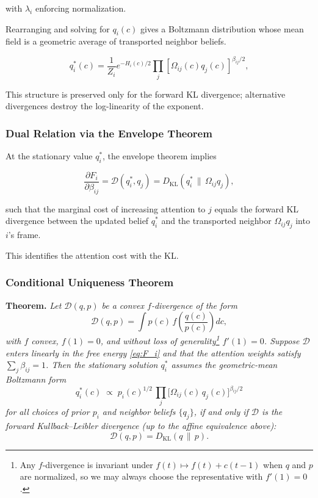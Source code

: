 \documentclass[twoside,11pt]{article}
\begin{document}
with $\lambda_i$ enforcing normalization.

Rearranging and solving for $q_i(c)$ gives a Boltzmann distribution whose mean field is a geometric average of transported neighbor beliefs.

\begin{equation}
q_i^*(c)
= \frac{1}{Z_i}
e^{-H_i(c)/2}
\prod_j
[\Omega_{ij}(c) q_j(c)]^{\beta_{ij}/2},
\label{eq:q_i_star}
\end{equation}

This structure is preserved only for the forward KL divergence; alternative divergences destroy the log-linearity of the exponent.

\subsubsection{Dual Relation via the Envelope Theorem}
At the stationary value $q_i^*$, the envelope theorem implies

\begin{equation}
\frac{\partial F_i}{\partial \beta_{ij}}
= \mathcal{D}(q_i^*, q_j)
= D_{\mathrm{KL}}(q_i^* \,\|\, \Omega_{ij} q_j),
\label{eq:envelope}
\end{equation}

such that the marginal cost of increasing attention to $j$ equals the forward KL divergence between the updated belief $q_i^*$ and the transported neighbor $\Omega_{ij} q_j$ into $i$'s frame.

This identifies the attention cost with the KL.

\subsubsection{Conditional Uniqueness Theorem}
\label{thm:uniqueness}

\textbf{Theorem.} \textit{Let\/ $\mathcal{D}(q,p)$ be a convex $f$-divergence of the form
\[
\mathcal{D}(q,p)
= \int p(c)\,f\!\!\left(\frac{q(c)}{p(c)}\right)dc,
\]
with $f$ convex, $f(1)=0$, and without loss of generality\footnote{Any $f$-divergence is invariant under $f(t)\mapsto f(t)+c(t-1)$ when $q$ and $p$ are normalized, so we may always choose the representative with $f'(1)=0$.} $f'(1)=0$.  Suppose $\mathcal{D}$ enters linearly in the free energy \eqref{eq:F_i} and that the attention weights satisfy $\sum_j\beta_{ij}=1$.  Then the stationary solution $q_i^*$ assumes the geometric-mean Boltzmann form}
\begin{equation}
q_i^*(c) \;\propto\; p_i(c)^{1/2}\,\prod_{j}\bigl[\Omega_{ij}(c)\,q_j(c)\bigr]^{\beta_{ij}/2}
\label{eq:geometric_mean_target}
\end{equation}
\textit{for all choices of prior $p_i$ and neighbor beliefs $\{q_j\}$, if and only if $\mathcal{D}$ is the forward Kullback--Leibler divergence (up to the affine equivalence above):}
\[
\mathcal{D}(q,p) = D_{\mathrm{KL}}(q\,\|\,p).
\]
\end{document}
